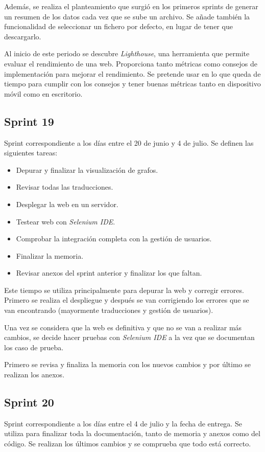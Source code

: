 Además, se realiza el planteamiento que surgió en los primeros sprints de generar un resumen de los datos cada vez que se sube un archivo. Se añade también la funcionalidad de seleccionar un fichero por defecto, en lugar de tener que descargarlo.

Al inicio de este periodo se descubre \textit{Lighthouse}, una herramienta que permite evaluar el rendimiento de una web. Proporciona tanto métricas como consejos de implementación para mejorar el rendimiento. Se pretende usar en lo que queda de tiempo para cumplir con los consejos y tener buenas métricas tanto en dispositivo móvil como en escritorio.

\subsection{Sprint 19}
Sprint correspondiente a los días entre el 20 de junio y 4 de julio. Se definen las siguientes tareas:
\begin{itemize}
	\item Depurar y finalizar la visualización de grafos.
	\item Revisar todas las traducciones.
	\item Desplegar la web en un servidor.
	\item Testear web con \textit{Selenium IDE}.
	\item Comprobar la integración completa con la gestión de usuarios.
	\item Finalizar la memoria.
	\item Revisar anexos del sprint anterior y finalizar los que faltan.
\end{itemize}

Este tiempo se utiliza principalmente para depurar la web y corregir errores. Primero se realiza el despliegue y después se van corrigiendo los errores que se van encontrando (mayormente traducciones y gestión de usuarios). 

Una vez se considera que la web es definitiva y que no se van a realizar más cambios, se decide hacer pruebas con \textit{Selenium IDE} a la vez que se documentan los caso de prueba.

Primero se revisa y finaliza la memoria con los nuevos cambios y por último se realizan los anexos.

\subsection{Sprint 20}
Sprint correspondiente a los días entre el 4 de julio y la fecha de entrega. Se utiliza para finalizar toda la documentación, tanto de memoria y anexos como del código. Se realizan los últimos cambios y se comprueba que todo está correcto.

